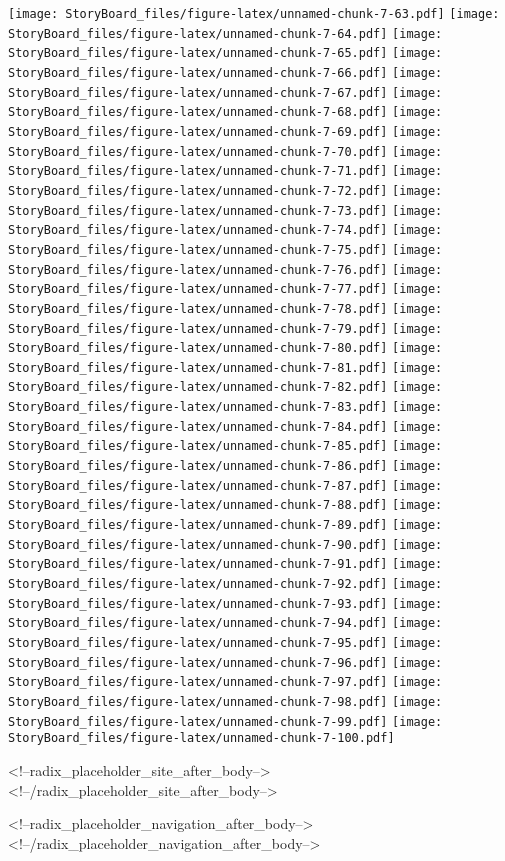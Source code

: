 \documentclass[
]{article}
\begin{document}
\texttt{[image: StoryBoard\_files/figure-latex/unnamed-chunk-7-63.pdf]}
\texttt{[image: StoryBoard\_files/figure-latex/unnamed-chunk-7-64.pdf]}
\texttt{[image: StoryBoard\_files/figure-latex/unnamed-chunk-7-65.pdf]}
\texttt{[image: StoryBoard\_files/figure-latex/unnamed-chunk-7-66.pdf]}
\texttt{[image: StoryBoard\_files/figure-latex/unnamed-chunk-7-67.pdf]}
\texttt{[image: StoryBoard\_files/figure-latex/unnamed-chunk-7-68.pdf]}
\texttt{[image: StoryBoard\_files/figure-latex/unnamed-chunk-7-69.pdf]}
\texttt{[image: StoryBoard\_files/figure-latex/unnamed-chunk-7-70.pdf]}
\texttt{[image: StoryBoard\_files/figure-latex/unnamed-chunk-7-71.pdf]}
\texttt{[image: StoryBoard\_files/figure-latex/unnamed-chunk-7-72.pdf]}
\texttt{[image: StoryBoard\_files/figure-latex/unnamed-chunk-7-73.pdf]}
\texttt{[image: StoryBoard\_files/figure-latex/unnamed-chunk-7-74.pdf]}
\texttt{[image: StoryBoard\_files/figure-latex/unnamed-chunk-7-75.pdf]}
\texttt{[image: StoryBoard\_files/figure-latex/unnamed-chunk-7-76.pdf]}
\texttt{[image: StoryBoard\_files/figure-latex/unnamed-chunk-7-77.pdf]}
\texttt{[image: StoryBoard\_files/figure-latex/unnamed-chunk-7-78.pdf]}
\texttt{[image: StoryBoard\_files/figure-latex/unnamed-chunk-7-79.pdf]}
\texttt{[image: StoryBoard\_files/figure-latex/unnamed-chunk-7-80.pdf]}
\texttt{[image: StoryBoard\_files/figure-latex/unnamed-chunk-7-81.pdf]}
\texttt{[image: StoryBoard\_files/figure-latex/unnamed-chunk-7-82.pdf]}
\texttt{[image: StoryBoard\_files/figure-latex/unnamed-chunk-7-83.pdf]}
\texttt{[image: StoryBoard\_files/figure-latex/unnamed-chunk-7-84.pdf]}
\texttt{[image: StoryBoard\_files/figure-latex/unnamed-chunk-7-85.pdf]}
\texttt{[image: StoryBoard\_files/figure-latex/unnamed-chunk-7-86.pdf]}
\texttt{[image: StoryBoard\_files/figure-latex/unnamed-chunk-7-87.pdf]}
\texttt{[image: StoryBoard\_files/figure-latex/unnamed-chunk-7-88.pdf]}
\texttt{[image: StoryBoard\_files/figure-latex/unnamed-chunk-7-89.pdf]}
\texttt{[image: StoryBoard\_files/figure-latex/unnamed-chunk-7-90.pdf]}
\texttt{[image: StoryBoard\_files/figure-latex/unnamed-chunk-7-91.pdf]}
\texttt{[image: StoryBoard\_files/figure-latex/unnamed-chunk-7-92.pdf]}
\texttt{[image: StoryBoard\_files/figure-latex/unnamed-chunk-7-93.pdf]}
\texttt{[image: StoryBoard\_files/figure-latex/unnamed-chunk-7-94.pdf]}
\texttt{[image: StoryBoard\_files/figure-latex/unnamed-chunk-7-95.pdf]}
\texttt{[image: StoryBoard\_files/figure-latex/unnamed-chunk-7-96.pdf]}
\texttt{[image: StoryBoard\_files/figure-latex/unnamed-chunk-7-97.pdf]}
\texttt{[image: StoryBoard\_files/figure-latex/unnamed-chunk-7-98.pdf]}
\texttt{[image: StoryBoard\_files/figure-latex/unnamed-chunk-7-99.pdf]}
\texttt{[image: StoryBoard\_files/figure-latex/unnamed-chunk-7-100.pdf]}

<!--radix_placeholder_site_after_body-->
<!--/radix_placeholder_site_after_body-->

<!--radix_placeholder_navigation_after_body-->
<!--/radix_placeholder_navigation_after_body-->
\end{document}
